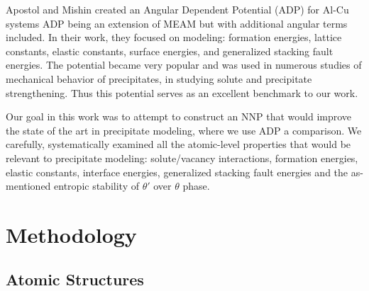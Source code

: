 \documentclass{article}
\begin{document}
Apostol and Mishin created an Angular Dependent Potential (ADP) for Al-Cu systems\cite{Apostol2011} ADP being an extension of MEAM but with additional angular terms included.
In their work, they focused on modeling: formation energies, lattice constants, elastic constants, surface energies, and generalized stacking fault energies.
The potential became very popular and was used in numerous studies of mechanical behavior of precipitates,
in studying solute and precipitate strengthening\cite{Singh2013AnAlloy}\cite{Esteban-Manzanares2019}\cite{Wu2020AtomisticAlloys}. Thus this potential serves as an excellent benchmark to our work. 

Our goal in this work was to attempt to construct an NNP that would improve the state of the art in precipitate modeling, where we use ADP a comparison.
We carefully, systematically examined all the atomic-level properties that would be relevant to precipitate modeling: solute/vacancy interactions, formation energies, elastic constants, interface energies, generalized stacking fault energies and the as-mentioned entropic stability of $\theta'$ over $\theta$ phase.


\section{Methodology}
\subsection{Atomic Structures} \label{sct:atomic_structures}
\end{document}
